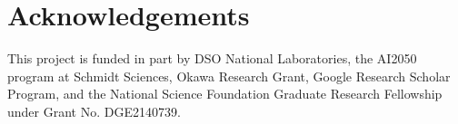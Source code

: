 \section*{Acknowledgements}
This project is funded in part by DSO National Laboratories, the AI2050 program at Schmidt Sciences, Okawa Research Grant, Google Research Scholar Program, and the National Science Foundation Graduate Research Fellowship under Grant No. DGE2140739. 

